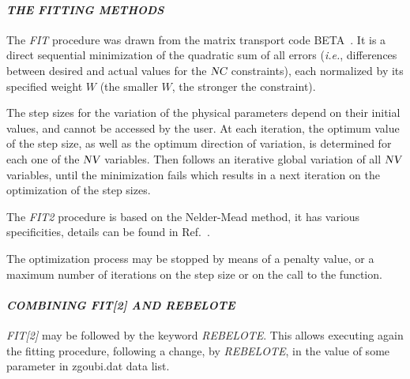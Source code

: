 

\smallskip

\paragraph{\textit{THE FITTING METHODS }}    %


\noindent The   \textsl{FIT} procedure was drawn from  the matrix transport code BETA~\cite{Biblio10}. 
 It is a direct sequential minimization of the quadratic
sum of all errors (\emph{i.e.}, differences between desired and actual values for the $\textsl{NC}$ 
constraints), each normalized by its specified weight $ W $ (the smaller $ W$,
the stronger the constraint). 

\noindent The step sizes for the variation of the physical parameters depend
on their initial  values, and cannot be accessed by the user. At each iteration, the 
optimum value of the step size, as well as the optimum direction of variation,
is determined for each one of the $\textsl{NV}$ variables. Then follows an iterative
global variation of all $\textsl{NV}$ variables, until the minimization fails which results in a
next iteration on the optimization of the step sizes. 

\medskip

\noindent The \textsl{FIT2} procedure is based on the  Nelder-Mead method, it has various specificities, 
details can be found in Ref.~\cite{NelderMead}.


\medskip

\noindent  The optimization process may be stopped by means of a penalty value, or a maximum number of 
iterations on the step size or on the call to the function. 



\bigskip

\paragraph{\textit{COMBINING FIT[2] AND REBELOTE } }    %


\noindent \textsl{FIT[2]} may be followed by the keyword  \textsl{REBELOTE}.  This allows executing again 
the  fitting procedure, following a change, by  \textsl{REBELOTE}, in  the value of some parameter in zgoubi.dat data list. 


